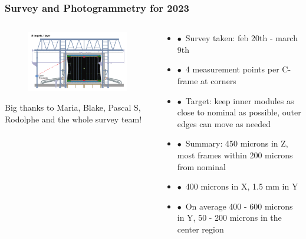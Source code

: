 \documentclass[aspectratio=1610, 12pt, xcolor=dvipsnames]{beamer}
\begin{document}
\begin{frame}\frametitle{Survey and Photogrammetry for 2023}
  \begin{columns}
    \begin{column}[c]{0.52\textwidth}
      \begin{figure}
        \includegraphics[width=\textwidth]{plots/survey_photo.png}
      \end{figure}
      Big thanks to Maria, Blake, Pascal S, Rodolphe and the whole survey team!
    \end{column}
    \begin{column}[c]{0.48\textwidth}
      \begin{itemize}
        \item $\bullet$\, Survey taken: feb 20th - march 9th
        \item $\bullet$\, 4 measurement points per C-frame at corners
        \item $\bullet$\, Target: keep inner modules as close to nominal as possible, outer edges can move as needed
        \item $\bullet$\, Summary: 450 microns in Z, most frames within 200 microns from nominal
        \item $\bullet$\, 400 microns in X, 1.5 mm in Y
        \item $\bullet$\, On average 400 - 600 microns in Y, 50 - 200 microns in the center region
      \end{itemize}
    \end{column}
  \end{columns}
\end{frame}
\end{document}
